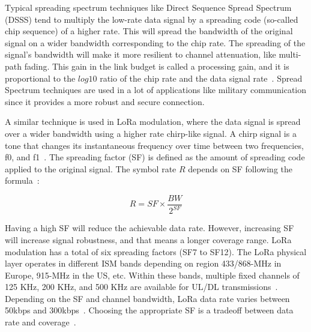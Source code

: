 \documentclass[]{IEEEtran}
\begin{document}
Typical spreading spectrum techniques like Direct Sequence Spread Spectrum (DSSS) tend to multiply the low-rate data signal by a spreading code (so-called chip sequence) of a higher rate.
This will spread the bandwidth of the original signal on a wider bandwidth corresponding to the chip rate.
The spreading of the signal's bandwidth will make it more resilient to channel attenuation, like multi-path fading.
This gain in the link budget is called a processing gain, and it is proportional to the $log10$ ratio of the chip rate and the data signal rate~\cite{LoRaWAN_semtech}.
Spread Spectrum techniques are used in a lot of applications like military communication since it provides a more robust and secure connection.

A similar technique is used in LoRa modulation, where the data signal is spread over a wider bandwidth using a higher rate chirp-like signal.
A chirp signal is a tone that changes its instantaneous frequency over time between two frequencies, f0, and f1~\cite{haxhibeqiri2018survey}. The spreading factor (SF) is defined as the amount of spreading code applied to the original signal.
The symbol rate $R$ depends on SF following the formula~\cite{vangelista2017frequency}:

\begin{equation}
R=SF\times \frac{BW}{2^{SF}}
\label{equ:SF-Rate}
\end{equation}

Having a high SF will reduce the achievable data rate.
However, increasing SF will increase signal robustness, and that means a longer coverage range.
LoRa modulation has a total of six spreading factors (SF7 to SF12).
The LoRa physical layer operates in different ISM bands depending on region 433/868-MHz in Europe, 915-MHz in the US, etc.
Within these bands, multiple fixed channels of 125 KHz, 200 KHz, and 500 KHz are available for UL/DL transmissions~\cite{adelantado2017understanding}.
Depending on the SF and channel bandwidth, LoRa data rate varies between 50kbps and 300kbps~\cite{LoRaWAN_spec}.
Choosing the appropriate SF is a tradeoff between data rate and coverage~\cite{boisgueneSurveyNBIoTDownlink2017}.
\end{document}
